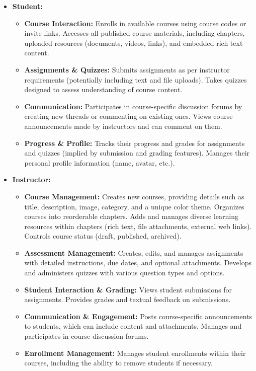 \begin{itemize}
    \item \textbf{Student:}
    \begin{itemize}
        \item \textbf{Course Interaction:} Enrolls in available courses using course codes or invite links. Accesses all published course materials, including chapters, uploaded resources (documents, videos, links), and embedded rich text content.
        \item \textbf{Assignments \& Quizzes:} Submits assignments as per instructor requirements (potentially including text and file uploads). Takes quizzes designed to assess understanding of course content.
        \item \textbf{Communication:} Participates in course-specific discussion forums by creating new threads or commenting on existing ones. Views course announcements made by instructors and can comment on them.
        \item \textbf{Progress \& Profile:} Tracks their progress and grades for assignments and quizzes (implied by submission and grading features). Manages their personal profile information (name, avatar, etc.).
    \end{itemize}
    \item \textbf{Instructor:}
    \begin{itemize}
        \item \textbf{Course Management:} Creates new courses, providing details such as title, description, image, category, and a unique color theme. Organizes courses into reorderable chapters. Adds and manages diverse learning resources within chapters (rich text, file attachments, external web links). Controls course status (draft, published, archived).
        \item \textbf{Assessment Management:} Creates, edits, and manages assignments with detailed instructions, due dates, and optional attachments. Develops and administers quizzes with various question types and options.
        \item \textbf{Student Interaction \& Grading:} Views student submissions for assignments. Provides grades and textual feedback on submissions.
        \item \textbf{Communication \& Engagement:} Posts course-specific announcements to students, which can include content and attachments. Manages and participates in course discussion forums.
        \item \textbf{Enrollment Management:} Manages student enrollments within their courses, including the ability to remove students if necessary.

\end{itemize}
\end{itemize}
